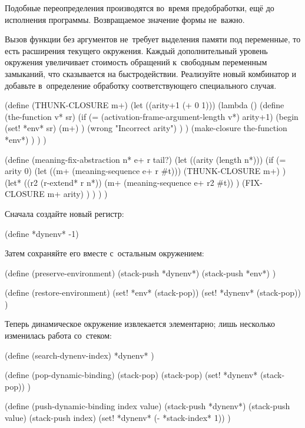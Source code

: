 Подобные переопределения производятся во~время предобработки, ещё до исполнения
программы. Возвращаемое значение формы  не~важно.



Вызов функции без аргументов не~требует выделения памяти под переменные, то есть
расширения текущего окружения. Каждый дополнительный уровень окружения
увеличивает стоимость обращений к~свободным переменным замыканий, что
сказывается на быстродействии. Реализуйте новый комбинатор и добавьте
в~определение  обработку соответствующего
специального случая.

\begin{code:lisp}
(define (THUNK-CLOSURE m+)
  (let ((arity+1 (+ 0 1)))
    (lambda ()
      (define (the-function v* sr)
        (if (= (activation-frame-argument-length v*) arity+1)
            (begin (set! *env* sr)
                   (m+) )
            (wrong "Incorrect arity") ) )
      (make-closure the-function *env*) ) ) )

(define (meaning-fix-abstraction n* e+ r tail?)
  (let ((arity (length n*)))
    (if (= arity 0)
        (let ((m+ (meaning-sequence e+ r #t)))
          (THUNK-CLOSURE m+) )
        (let* ((r2 (r-extend* r n*))
               (m+ (meaning-sequence e+ r2 #t)) )
          (FIX-CLOSURE m+ arity) ) ) ) )
\end{code:lisp}




Сначала создайте новый регистр:

\begin{code:lisp}
(define *dynenv* -1)
\end{code:lisp}

\noindent
Затем сохраняйте его вместе с~остальным окружением:

\begin{code:lisp}
(define (preserve-environment)
  (stack-push *dynenv*)
  (stack-push *env*) )

(define (restore-environment)
  (set! *env* (stack-pop))
  (set! *dynenv* (stack-pop)) )
\end{code:lisp}

\noindent
Теперь динамическое окружение извлекается элементарно; лишь несколько изменилась работа со~стеком:

\begin{code:lisp}
(define (search-dynenv-index)
  *dynenv* )

(define (pop-dynamic-binding)
  (stack-pop)
  (stack-pop)
  (set! *dynenv* (stack-pop)) )

(define (push-dynamic-binding index value)
  (stack-push *dynenv*)
  (stack-push value)
  (stack-push index)
  (set! *dynenv* (- *stack-index* 1)) )
\end{code:lisp}


